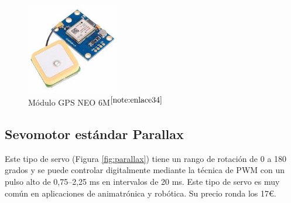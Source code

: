 \begin{figure} [h!]
	\begin{center}
		\includegraphics[width=4cm]{figs/GPSNEO6MV2.jpeg}
	\end{center}
	\caption{Módulo GPS NEO 6M$^{\ref{note:enlace34}}$} 
\label{fig:gps}
\end{figure}

\setcounter{footnote}{34} %


\subsection{Sevomotor estándar Parallax}
\label{subsec:motor}

Este tipo de servo (Figura \ref{fig:parallax}) tiene un rango de rotación de 0 a 180 grados y se puede controlar digitalmente mediante la técnica de \ac{PWM} con un pulso alto de 0,75–2,25 ms en intervalos de 20 ms. Este tipo de servo es muy común en aplicaciones de animatrónica y robótica. Su precio ronda los 17€.



